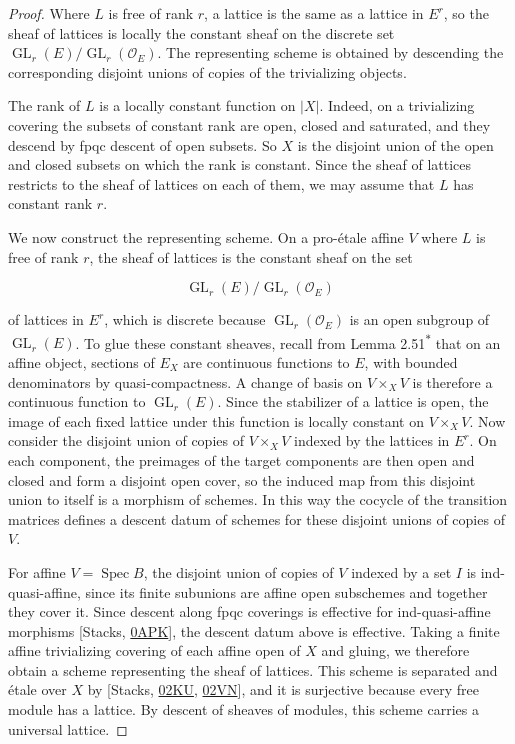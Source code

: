 \documentclass[11pt]{article}
\newcommand{\bpout}[1]{#1\textsuperscript{\hyperlink{bp-outside}{\ensuremath{\ast}}}}
\providecommand{\GL}{}\renewcommand{\GL}{\operatorname{GL}}
\begin{document}
\begin{proof}[{Proof}]\label{bp49}%
Where \(L\) is free of rank \(r\), a lattice is the same as a lattice in \(E^r\), so the sheaf of lattices is locally the constant sheaf on the discrete set \(\GL_r(E)/\GL_r(\mathcal O_E)\). The representing scheme is obtained by descending the corresponding disjoint unions of copies of the trivializing objects.

The rank of \(L\) is a locally constant function on \(|X|\). Indeed, on a trivializing covering the subsets of constant rank are open, closed and saturated, and they descend by fpqc descent of open subsets. So \(X\) is the disjoint union of the open and closed subsets on which the rank is constant. Since the sheaf of lattices restricts to the sheaf of lattices on each of them, we may assume that \(L\) has constant rank \(r\).

We now construct the representing scheme. On a pro-étale affine \(V\) where \(L\) is free of rank \(r\), the sheaf of lattices is the constant sheaf on the set

\[
\GL_r(E)/\GL_r(\mathcal O_E)
\]

of lattices in \(E^r\), which is discrete because \(\GL_r(\mathcal O_E)\) is an open subgroup of \(\GL_r(E)\). To glue these constant sheaves, recall from Lemma \bpout{2.51} that on an affine object, sections of \(E_X\) are continuous functions to \(E\), with bounded denominators by quasi-compactness. A change of basis on \(V\times_XV\) is therefore a continuous function to \(\GL_r(E)\). Since the stabilizer of a lattice is open, the image of each fixed lattice under this function is locally constant on \(V\times_XV\). Now consider the disjoint union of copies of \(V\times_XV\) indexed by the lattices in \(E^r\). On each component, the preimages of the target components are then open and closed and form a disjoint open cover, so the induced map from this disjoint union to itself is a morphism of schemes. In this way the cocycle of the transition matrices defines a descent datum of schemes for these disjoint unions of copies of \(V\).

For affine \(V=\operatorname{Spec}B\), the disjoint union of copies of \(V\) indexed by a set \(I\) is ind-quasi-affine, since its finite subunions are affine open subschemes and together they cover it. Since descent along fpqc coverings is effective for ind-quasi-affine morphisms [Stacks, \href{https://stacks.math.columbia.edu/tag/0APK}{0APK}], the descent datum above is effective. Taking a finite affine trivializing covering of each affine open of \(X\) and gluing, we therefore obtain a scheme representing the sheaf of lattices. This scheme is separated and étale over \(X\) by [Stacks, \href{https://stacks.math.columbia.edu/tag/02KU}{02KU}, \href{https://stacks.math.columbia.edu/tag/02VN}{02VN}], and it is surjective because every free module has a lattice. By descent of sheaves of modules, this scheme carries a universal lattice.
\end{proof}
\end{document}
